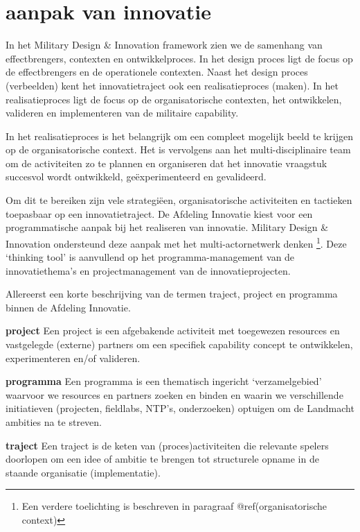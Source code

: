 \documentclass[
]{book}
\begin{document}
\hypertarget{aanpak-van-innovatie}{%
\section{aanpak van innovatie}\label{aanpak-van-innovatie}}

In het Military Design \& Innovation framework zien we de samenhang van effectbrengers, contexten en ontwikkelproces. In het design proces ligt de focus op de effectbrengers en de operationele contexten. Naast het design proces (verbeelden) kent het innovatietraject ook een realisatieproces (maken). In het realisatieproces ligt de focus op de organisatorische contexten, het ontwikkelen, valideren en implementeren van de militaire capability.

In het realisatieproces is het belangrijk om een compleet mogelijk beeld te krijgen op de organisatorische context. Het is vervolgens aan het multi-disciplinaire team om de activiteiten zo te plannen en organiseren dat het innovatie vraagstuk succesvol wordt ontwikkeld, geëxperimenteerd en gevalideerd.

Om dit te bereiken zijn vele strategiëen, organisatorische activiteiten en tactieken toepasbaar op een innovatietraject. De Afdeling Innovatie kiest voor een programmatische aanpak bij het realiseren van innovatie. Military Design \& Innovation ondersteund deze aanpak met het multi-actornetwerk denken \footnote{Een verdere toelichting is beschreven in paragraaf @ref(organisatorische context)}. Deze `thinking tool' is aanvullend op het programma-management van de innovatiethema's en projectmanagement van de innovatieprojecten.

Allereerst een korte beschrijving van de termen traject, project en programma binnen de Afdeling Innovatie.

\textbf{project}
Een project is een afgebakende activiteit met toegewezen resources en vastgelegde (externe) partners om een specifiek capability concept te ontwikkelen, experimenteren en/of valideren.

\textbf{programma}
Een programma is een thematisch ingericht `verzamelgebied' waarvoor we resources en partners zoeken en binden en waarin we verschillende initiatieven (projecten, fieldlabs, NTP's, onderzoeken) optuigen om de Landmacht ambities na te streven.

\textbf{traject}
Een traject is de keten van (proces)activiteiten die relevante spelers doorlopen om een idee of ambitie te brengen tot structurele opname in de staande organisatie (implementatie).
\end{document}

